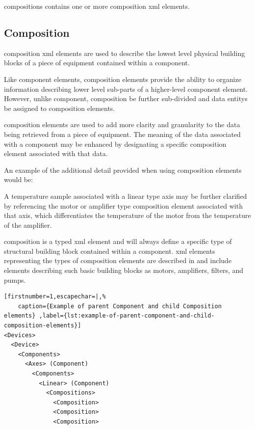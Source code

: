 \gls{compositions} contains one or more \gls{composition} \gls{xml} elements.



\subsection{Composition}

\gls{composition} \gls{xml} elements are used to describe the lowest level physical building blocks of a piece of equipment contained within a \gls{component}.

Like \gls{component} elements, \gls{composition} elements provide the ability to organize information describing \gls{lower level} sub-parts of a higher-level \gls{component} element.  However, unlike \gls{component}, \gls{composition} \mustnot be further sub-divided and \glspl{data entity} \mustnot be assigned to \gls{composition} elements.

\gls{composition} elements are used to add more clarity and granularity to the data being retrieved from a piece of equipment.  The meaning of the data associated with a \gls{component} may be enhanced by designating a specific \gls{composition} element associated with that data.  

An example of the additional detail provided when using \gls{composition} elements would be:

A \gls{temperature sample} associated with a \gls{linear} type axis may be further clarified by referencing the \gls{motor} or \gls{amplifier} type \gls{composition} element associated with that axis, which differentiates the temperature of the motor from the temperature of the amplifier.

\gls{composition} is a typed \gls{xml} element and will always define a specific type of structural building block contained within a \gls{component}.  \gls{xml} elements representing the types of \gls{composition} elements are described in  and include elements describing such basic building blocks as motors, amplifiers, filters, and pumps.

\begin{lstlisting}[firstnumber=1,escapechar=|,%
    caption={Example of parent Component and child Composition elements} ,label={lst:example-of-parent-component-and-child-composition-elements}]
<Devices>
  <Device>
    <Components>
      <Axes> (Component)
        <Components>
          <Linear> (Component)
            <Compositions>
              <Composition>
              <Composition>
              <Composition>
\end{lstlisting}

